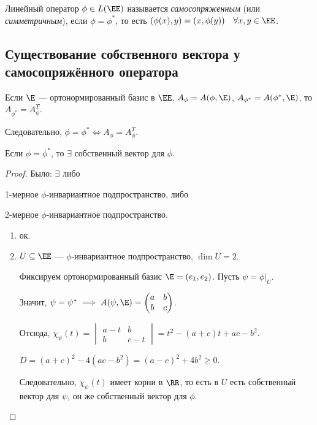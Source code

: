 \begin{definition}
    Линейный оператор $\phi \in L(\EE)$ называется \textit{самосопряженным} (или \textit{симметричным}), если $\phi = \phi^{*}$, то есть $(\phi(x), y) = (x, \phi(y)) \quad \forall x, y \in \EE$.
\end{definition}


\subsection{Существование собственного вектора у самосопряжённого оператора}

Если $\E$ --- ортонормированный базис в $\EE$, $A_\phi = A(\phi, \E)$, $A_{\phi^{*}} = A(\phi^{*}, \E)$, то $A_{\phi^{*}} = A_\phi^{T}$.

Следовательно, $\phi = \phi^{*} \iff A_\phi = A_\phi^{T}$.

\begin{proposal}
    Если $\phi = \phi^{*}$, то $\exists$ собственный вектор для $\phi$.
\end{proposal}

\begin{proof}
    Было: $\exists$ либо
    \begin{enumerate*}[label=\arabic*)]
    \item 1-мерное $\phi$-инвариантное подпространство, либо
    \item 2-мерное $\phi$-инвариантное подпространство.
    \end{enumerate*}

    \begin{enumerate}
    \item ок.
    \item $U \subseteq \EE$ --- $\phi$-инвариантное подпространство, $\dim U = 2$.

        Фиксируем ортонормированный базис $\E = (e_1, e_2)$. Пусть $\psi = \phi \big|_{U}$.

        Значит, $\psi = \psi^{*} \implies A(\psi, \E) = \begin{pmatrix} a & b \\ b & c \end{pmatrix}$.

        Отсюда, $\chi_\psi(t) = \begin{vmatrix} a - t & b \\ b & c - t \end{vmatrix} = t^2 - (a + c)t + ac - b^2$.

        $D = (a + c)^2 - 4(ac - b^2) = (a - c)^2 + 4b^2 \geq 0$.

        Следовательно, $\chi_\psi(t)$ имеет корни в $\RR$, то есть в $U$ есть собственный вектор для $\psi$, он же собственный вектор для $\phi$.
        \qedhere
    \end{enumerate}
\end{proof}


